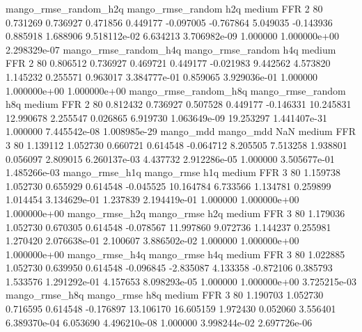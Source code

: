 mango_rmse_random_h2q mango_rmse_random                  h2q     medium      FFR                 2 80  0.731269       0.736927 0.471856       0.449177   -0.097005     -0.767864      5.049035    -0.143936       0.885918  1.688906 9.518112e-02     6.634213   3.706982e-09            1.000000    1.000000e+00        2.298329e-07
mango_rmse_random_h4q mango_rmse_random                  h4q     medium      FFR                 2 80  0.806512       0.736927 0.469721       0.449177   -0.021983      9.442562      4.573820     1.145232       0.255571  0.963017 3.384777e-01     0.859065   3.929036e-01            1.000000    1.000000e+00        1.000000e+00
mango_rmse_random_h8q mango_rmse_random                  h8q     medium      FFR                 2 80  0.812432       0.736927 0.507528       0.449177   -0.146331     10.245831     12.990678     2.255547       0.026865  6.919730 1.063649e-09    19.253297   1.441407e-31            1.000000    7.445542e-08        1.008985e-29
            mango_mdd         mango_mdd                  NaN     medium      FFR                 3 80  1.139112       1.052730 0.660721       0.614548   -0.064712      8.205505      7.513258     1.938801       0.056097  2.809015 6.260137e-03     4.437732   2.912286e-05            1.000000    3.505677e-01        1.485266e-03
       mango_rmse_h1q        mango_rmse                  h1q     medium      FFR                 3 80  1.159738       1.052730 0.655929       0.614548   -0.045525     10.164784      6.733566     1.134781       0.259899  1.014454 3.134629e-01     1.237839   2.194419e-01            1.000000    1.000000e+00        1.000000e+00
       mango_rmse_h2q        mango_rmse                  h2q     medium      FFR                 3 80  1.179036       1.052730 0.670305       0.614548   -0.078567     11.997860      9.072736     1.144237       0.255981  1.270420 2.076638e-01     2.100607   3.886502e-02            1.000000    1.000000e+00        1.000000e+00
       mango_rmse_h4q        mango_rmse                  h4q     medium      FFR                 3 80  1.022885       1.052730 0.639950       0.614548   -0.096845     -2.835087      4.133358    -0.872106       0.385793  1.533576 1.291292e-01     4.157653   8.098293e-05            1.000000    1.000000e+00        3.725215e-03
       mango_rmse_h8q        mango_rmse                  h8q     medium      FFR                 3 80  1.190703       1.052730 0.716595       0.614548   -0.176897     13.106170     16.605159     1.972430       0.052060  3.556401 6.389370e-04     6.053690   4.496210e-08            1.000000    3.998244e-02        2.697726e-06
